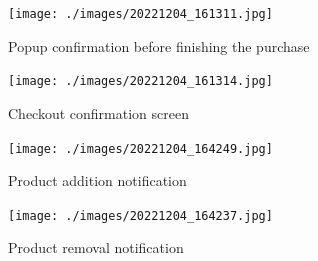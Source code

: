 \begin{figure}[H]
	\centering
    \caption[Popup confirmation before finishing the purchase]{Popup confirmation before finishing the purchase}
    \texttt{[image: ./images/20221204\_161311.jpg]}
    \fonte{}
\end{figure}

\begin{figure}[H]
	\centering
	\caption[Checkout confirmation screen]{Checkout confirmation screen}
    \texttt{[image: ./images/20221204\_161314.jpg]}
    \fonte{}
\end{figure}


\begin{figure}[H]
	\centering
	\caption[Product addition notification]{Product addition notification}
    \texttt{[image: ./images/20221204\_164249.jpg]}
    \fonte{}
\end{figure}

\begin{figure}[H]
	\centering
	\caption[Product removal notification]{Product removal notification}
    \texttt{[image: ./images/20221204\_164237.jpg]}
    \fonte{}
\end{figure}

